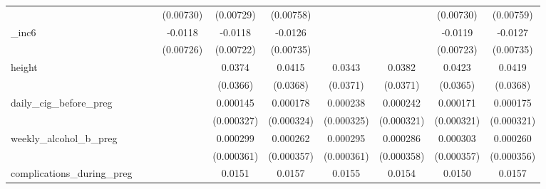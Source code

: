 \begin{table}[htbp]
\begin{tabular}{l*{9}{c}}
            &                     &                     &   (0.00730)         &   (0.00729)         &   (0.00758)         &                     &                     &   (0.00730)         &   (0.00759)         \\
[1em]
\_inc6       &                     &                     &     -0.0118         &     -0.0118         &     -0.0126\sym{*}  &                     &                     &     -0.0119\sym{*}  &     -0.0127\sym{*}  \\
            &                     &                     &   (0.00726)         &   (0.00722)         &   (0.00735)         &                     &                     &   (0.00723)         &   (0.00735)         \\
[1em]
height      &                     &                     &                     &      0.0374         &      0.0415         &      0.0343         &      0.0382         &      0.0423         &      0.0419         \\
            &                     &                     &                     &    (0.0366)         &    (0.0368)         &    (0.0371)         &    (0.0371)         &    (0.0365)         &    (0.0368)         \\
[1em]
daily\_cig\_before\_preg&                     &                     &                     &    0.000145         &    0.000178         &    0.000238         &    0.000242         &    0.000171         &    0.000175         \\
            &                     &                     &                     &  (0.000327)         &  (0.000324)         &  (0.000325)         &  (0.000321)         &  (0.000321)         &  (0.000321)         \\
[1em]
weekly\_alcohol\_b\_preg&                     &                     &                     &    0.000299         &    0.000262         &    0.000295         &    0.000286         &    0.000303         &    0.000260         \\
            &                     &                     &                     &  (0.000361)         &  (0.000357)         &  (0.000361)         &  (0.000358)         &  (0.000357)         &  (0.000356)         \\
[1em]
complications\_during\_preg&                     &                     &                     &      0.0151\sym{***}&      0.0157\sym{***}&      0.0155\sym{***}&      0.0154\sym{***}&      0.0150\sym{***}&      0.0157\sym{***}\\

\end{tabular}
\end{table}
